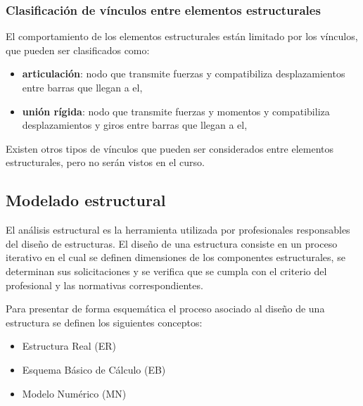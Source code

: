 \subsubsection{Clasificación de vínculos entre elementos estructurales}

El comportamiento de los elementos estructurales están limitado por los vínculos, que pueden ser clasificados como:
%
\begin{itemize}
\item \textbf{articulación}: nodo que transmite fuerzas y compatibiliza desplazamientos entre barras que llegan a el,
\item \textbf{unión rígida}: nodo que transmite fuerzas y momentos y compatibiliza desplazamientos y giros entre barras que llegan a el,
\end{itemize}

Existen otros tipos de vínculos que pueden ser considerados entre elementos estructurales, pero no serán vistos en el curso.













\subsection{Modelado estructural}

El análisis estructural es la herramienta utilizada por profesionales responsables del diseño de estructuras. %
%
El diseño de una estructura consiste en un proceso iterativo en el cual se definen dimensiones de los componentes estructurales, se determinan sus solicitaciones y se verifica que se cumpla con el criterio del profesional y las normativas correspondientes. %
%

Para presentar de forma esquemática el proceso asociado al diseño de una estructura se definen los siguientes conceptos:
%
\begin{itemize}
  \item Estructura Real (ER)
  \item Esquema Básico de Cálculo (EB)
  \item Modelo Numérico (MN)
\end{itemize}

